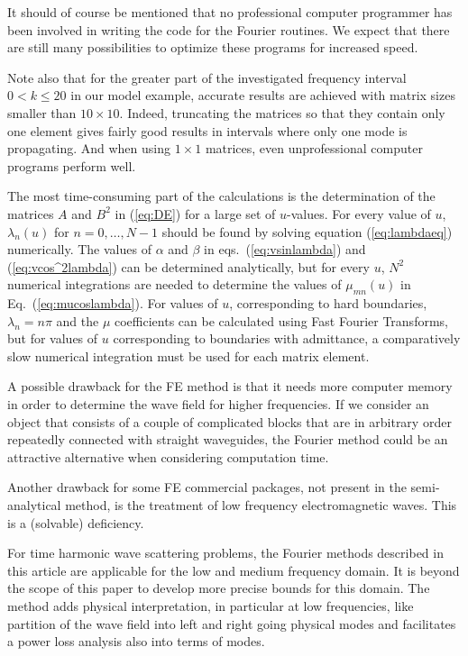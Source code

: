 \documentclass[numreferences]{kluwer}
\begin{document}
It should of course be mentioned that no professional computer
programmer has been involved in writing the code for the Fourier
routines. We expect that there are still many possibilities to optimize
these programs for increased speed.

Note also that
for the greater part of the investigated frequency interval $0<k\le20$
in our model example, accurate results are achieved with matrix sizes
smaller than $10\times10$. Indeed,
truncating the matrices so that they contain only one
element gives fairly good results in intervals where only one
mode is propagating. And when using $1\times1$ matrices, even
unprofessional computer programs perform well.

The most time-consuming part of the calculations is the determination
of the matrices $A$ and $B^2$ in (\ref{eq:DE}) for a large set of
$u$-values. For every value of $u$, $\lambda_n(u)$ for $n=0,\dots,N-1$
should be found by solving equation (\ref{eq:lambdaeq}) numerically.
The values of $\alpha$ and $\beta$ in eqs.~(\ref{eq:vsinlambda}) and
(\ref{eq:vcos^2lambda}) can be determined analytically, but for every
$u$, $N^2$ numerical integrations are needed to determine the values
of $\mu_{mn}(u)$ in Eq.~(\ref{eq:mucoslambda}). For values of $u$,
corresponding to hard boundaries, $\lambda_n=n\pi$ and the $\mu$
coefficients can be calculated using Fast Fourier Transforms, but for
values of $u$ corresponding to boundaries with admittance, a
comparatively slow numerical integration must be used for each matrix
element.


A possible drawback for the FE method is that it needs more computer
memory
in order to determine the wave field for higher frequencies.
If we consider an object that consists of a couple of complicated
blocks that are in arbitrary order repeatedly connected with straight
waveguides, the Fourier method could be an attractive alternative when
considering computation time.

Another drawback for some FE commercial packages, not present in the semi-analytical method, is the treatment of low frequency electromagnetic waves. This is a (solvable) \cite{AndriulliCoolsOlyslagerMichielssen2008,chew2014}
deficiency.

For time harmonic wave scattering problems, the Fourier methods
described in this article are applicable for the low and medium
frequency domain. It is beyond the scope of this paper to develop more
precise bounds for this domain. The method adds physical
interpretation, in particular at low frequencies, like partition of
the wave field into left and right going physical modes and
facilitates a power loss analysis also into terms of modes.
\end{document}

